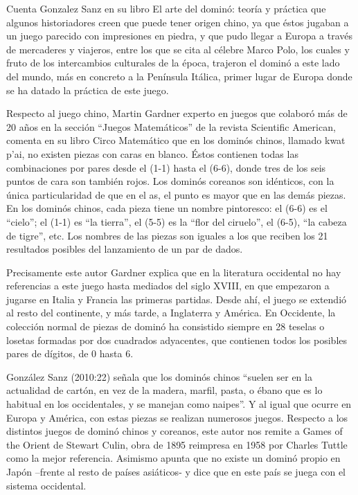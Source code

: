 Cuenta Gonzalez Sanz en su libro El arte del dominó: teoría y práctica que algunos historiadores creen que puede tener origen chino, ya que éstos jugaban a un juego parecido con impresiones en piedra, y que pudo llegar a Europa a través de mercaderes y viajeros, entre los que se cita al célebre Marco Polo, los cuales y fruto de los intercambios culturales de la época, trajeron el dominó a este lado del mundo, más en concreto a la Península Itálica, primer lugar de Europa donde se ha datado la práctica de este juego.

Respecto al juego chino, Martin Gardner experto en juegos que colaboró más de 20 años en la sección “Juegos Matemáticos” de la revista Scientific American, comenta en su libro Circo Matemático que en los dominós chinos, llamado kwat p’ai, no existen piezas con caras en blanco. Éstos contienen todas las combinaciones por pares desde el (1-1)  hasta el (6-6), donde tres de los seis puntos de cara  son también rojos. Los dominós coreanos son idénticos, con la única particularidad de que en el as, el punto es mayor que en las demás piezas. En los dominós chinos, cada pieza tiene un nombre pintoresco: el (6-6) es el “cielo”; el (1-1) es “la tierra”, el (5-5) es la “flor del ciruelo”, el (6-5), “la cabeza de tigre”, etc. Los nombres de las piezas son iguales a los que reciben los 21 resultados posibles del lanzamiento de un par de dados.

Precisamente este autor Gardner explica que en la literatura occidental no hay referencias a este juego hasta mediados del siglo XVIII, en que empezaron a jugarse en Italia y Francia las primeras partidas. Desde ahí, el juego se extendió al resto del continente, y más tarde, a Inglaterra y América. En Occidente, la colección normal de piezas de dominó ha consistido siempre en 28 teselas o losetas formadas por dos cuadrados adyacentes, que contienen todos los posibles pares de dígitos, de 0 hasta 6. 

González Sanz (2010:22) señala que los dominós chinos “suelen ser en la actualidad de cartón, en vez de la madera, marfil, pasta, o ébano que es lo habitual en los occidentales, y se manejan como naipes”. Y al igual que ocurre en Europa y América, con estas piezas se realizan numerosos juegos. Respecto a los distintos juegos de dominó chinos y coreanos, este autor nos remite a Games of the Orient de Stewart Culin, obra de 1895 reimpresa en 1958 por Charles Tuttle como la mejor referencia. Asimismo apunta que no existe un dominó propio en Japón –frente al resto de países asiáticos- y dice que en este país se juega con el sistema occidental.

